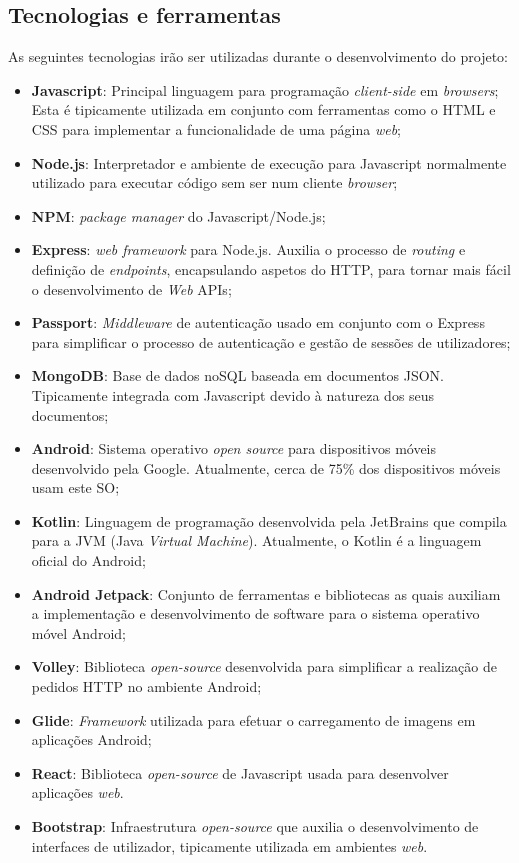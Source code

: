 \subsection{Tecnologias e ferramentas}
As seguintes tecnologias irão ser utilizadas durante o desenvolvimento do projeto:
\begin{itemize}
	\item \textbf{Javascript}: Principal linguagem para programação \textit{client-side} em \textit{browsers}; Esta é tipicamente utilizada em conjunto com ferramentas como o HTML e CSS para implementar a funcionalidade de uma página \textit{web};
	\item \textbf{Node.js}: Interpretador e ambiente de execução para Javascript normalmente utilizado para executar código sem ser num cliente \textit{browser};
	\item \textbf{NPM}: \textit{package manager} do Javascript/Node.js;
	\item \textbf{Express}: \textit{web framework} para Node.js. Auxilia o processo de \textit{routing} e definição de \textit{endpoints}, encapsulando aspetos do HTTP, para tornar mais fácil o desenvolvimento de \textit{Web} APIs;
	\item \textbf{Passport}: \textit{Middleware} de autenticação usado em conjunto com o Express para simplificar o processo de autenticação e gestão de sessões de utilizadores;
	\item \textbf{MongoDB}: Base de dados noSQL baseada em documentos JSON. Tipicamente integrada com Javascript devido à natureza dos seus documentos;
	\item \textbf{Android}: Sistema operativo \textit{open source} para dispositivos móveis desenvolvido pela Google. Atualmente, cerca de 75\% dos dispositivos móveis usam este SO;
	\item \textbf{Kotlin}: Linguagem de programação desenvolvida pela JetBrains que compila para a JVM (Java \textit{Virtual Machine}). Atualmente, o Kotlin é a linguagem oficial do Android;
	\item \textbf{Android Jetpack}: Conjunto de ferramentas e bibliotecas as quais auxiliam a implementação e desenvolvimento de software para o sistema operativo móvel Android;
	\item \textbf{Volley}: Biblioteca \textit{open-source} desenvolvida para simplificar a realização de pedidos HTTP no ambiente Android;
	\item \textbf{Glide}: \textit{Framework} utilizada para efetuar o carregamento de imagens em aplicações Android;
	\item \textbf{React}: Biblioteca \textit{open-source} de Javascript usada para desenvolver aplicações \textit{web}.
	\item \textbf{Bootstrap}: Infraestrutura \textit{open-source} que auxilia o desenvolvimento de interfaces de utilizador, tipicamente utilizada em ambientes \textit{web}.
\end{itemize}